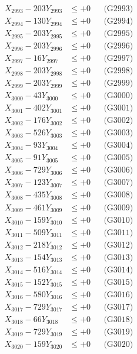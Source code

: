 \documentclass[a4paper,10pt]{article}
\begin{document}
{\begin{align}
X_{2993} - 203Y_{2993} &\leq +0 && \text{(G2993)} \\
X_{2994} - 130Y_{2994} &\leq +0 && \text{(G2994)} \\
X_{2995} - 203Y_{2995} &\leq +0 && \text{(G2995)} \\
X_{2996} - 203Y_{2996} &\leq +0 && \text{(G2996)} \\
X_{2997} - 16Y_{2997} &\leq +0 && \text{(G2997)} \\
X_{2998} - 203Y_{2998} &\leq +0 && \text{(G2998)} \\
X_{2999} - 203Y_{2999} &\leq +0 && \text{(G2999)} \\
X_{3000} - 43Y_{3000} &\leq +0 && \text{(G3000)} \\
\allowbreak
X_{3001} - 402Y_{3001} &\leq +0 && \text{(G3001)} \\
X_{3002} - 176Y_{3002} &\leq +0 && \text{(G3002)} \\
X_{3003} - 526Y_{3003} &\leq +0 && \text{(G3003)} \\
X_{3004} - 93Y_{3004} &\leq +0 && \text{(G3004)} \\
X_{3005} - 91Y_{3005} &\leq +0 && \text{(G3005)} \\
X_{3006} - 729Y_{3006} &\leq +0 && \text{(G3006)} \\
X_{3007} - 123Y_{3007} &\leq +0 && \text{(G3007)} \\
X_{3008} - 435Y_{3008} &\leq +0 && \text{(G3008)} \\
X_{3009} - 461Y_{3009} &\leq +0 && \text{(G3009)} \\
X_{3010} - 159Y_{3010} &\leq +0 && \text{(G3010)} \\
\allowbreak
X_{3011} - 509Y_{3011} &\leq +0 && \text{(G3011)} \\
X_{3012} - 218Y_{3012} &\leq +0 && \text{(G3012)} \\
X_{3013} - 154Y_{3013} &\leq +0 && \text{(G3013)} \\
X_{3014} - 516Y_{3014} &\leq +0 && \text{(G3014)} \\
X_{3015} - 152Y_{3015} &\leq +0 && \text{(G3015)} \\
X_{3016} - 580Y_{3016} &\leq +0 && \text{(G3016)} \\
X_{3017} - 729Y_{3017} &\leq +0 && \text{(G3017)} \\
X_{3018} - 66Y_{3018} &\leq +0 && \text{(G3018)} \\
X_{3019} - 729Y_{3019} &\leq +0 && \text{(G3019)} \\
X_{3020} - 159Y_{3020} &\leq +0 && \text{(G3020)} \\

\end{align}}
\end{document}
